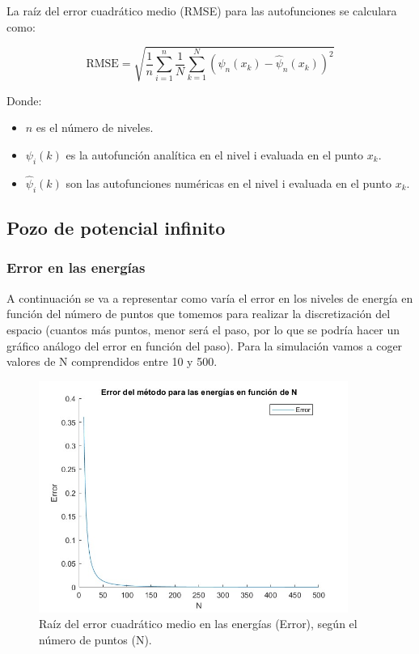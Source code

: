 \documentclass[12pt]{article}
\begin{document}
La raíz del error cuadrático medio (RMSE) para las autofunciones se calculara como:

\[
\text{RMSE} =\sqrt{\frac{1}{n}\sum_{i=1}^{n}\frac{1}{N} \sum_{k=1}^{N} (\psi_n(x_k) - \hat{\psi}_n(x_k))^2}
\]

Donde:
\begin{itemize}
    \item \( n \) es el número de niveles.
    \item \( \psi_i(k) \) es la autofunción analítica en el nivel i evaluada en el punto $x_k$.
    \item \( \hat{\psi}_i(k) \) son las autofunciones numéricas en el nivel i evaluada en el punto $x_k$.
\end{itemize}


    \subsection{Pozo de potencial infinito}

    \subsubsection{Error en las energías}

    A continuación se va a representar como varía el error en los niveles de energía en función del número de puntos que tomemos para realizar la discretización del espacio (cuantos más puntos, menor será el paso, por lo que se podría hacer un gráfico análogo del error en función del paso). Para la simulación vamos a coger valores de N comprendidos entre 10 y 500. 

    \begin{figure}[H]
        \centering
        \includegraphics[width=0.9\textwidth]{fotos/error_ener_infinito_500.jpg}
        \caption{Raíz del error cuadrático medio en las energías (Error), según el número de puntos (N).}
        \end{figure} 
\end{document}
